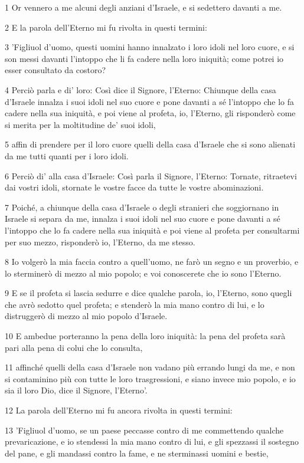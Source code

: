 \par 1 Or vennero a me alcuni degli anziani d'Israele, e si sedettero davanti a me.
\par 2 E la parola dell'Eterno mi fu rivolta in questi termini:
\par 3 'Figliuol d'uomo, questi uomini hanno innalzato i loro idoli nel loro cuore, e si son messi davanti l'intoppo che li fa cadere nella loro iniquità; come potrei io esser consultato da costoro?
\par 4 Perciò parla e di' loro: Così dice il Signore, l'Eterno: Chiunque della casa d'Israele innalza i suoi idoli nel suo cuore e pone davanti a sé l'intoppo che lo fa cadere nella sua iniquità, e poi viene al profeta, io, l'Eterno, gli risponderò come si merita per la moltitudine de' suoi idoli,
\par 5 affin di prendere per il loro cuore quelli della casa d'Israele che si sono alienati da me tutti quanti per i loro idoli.
\par 6 Perciò di' alla casa d'Israele: Così parla il Signore, l'Eterno: Tornate, ritraetevi dai vostri idoli, stornate le vostre facce da tutte le vostre abominazioni.
\par 7 Poiché, a chiunque della casa d'Israele o degli stranieri che soggiornano in Israele si separa da me, innalza i suoi idoli nel suo cuore e pone davanti a sé l'intoppo che lo fa cadere nella sua iniquità e poi viene al profeta per consultarmi per suo mezzo, risponderò io, l'Eterno, da me stesso.
\par 8 Io volgerò la mia faccia contro a quell'uomo, ne farò un segno e un proverbio, e lo sterminerò di mezzo al mio popolo; e voi conoscerete che io sono l'Eterno.
\par 9 E se il profeta si lascia sedurre e dice qualche parola, io, l'Eterno, sono quegli che avrò sedotto quel profeta; e stenderò la mia mano contro di lui, e lo distruggerò di mezzo al mio popolo d'Israele.
\par 10 E ambedue porteranno la pena della loro iniquità: la pena del profeta sarà pari alla pena di colui che lo consulta,
\par 11 affinché quelli della casa d'Israele non vadano più errando lungi da me, e non si contaminino più con tutte le loro trasgressioni, e siano invece mio popolo, e io sia il loro Dio, dice il Signore, l'Eterno'.
\par 12 La parola dell'Eterno mi fu ancora rivolta in questi termini:
\par 13 'Figliuol d'uomo, se un paese peccasse contro di me commettendo qualche prevaricazione, e io stendessi la mia mano contro di lui, e gli spezzassi il sostegno del pane, e gli mandassi contro la fame, e ne sterminassi uomini e bestie,
